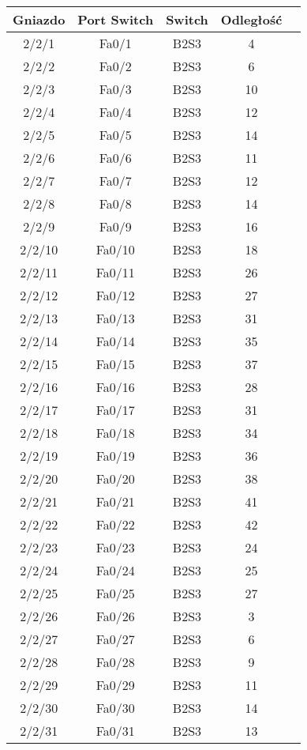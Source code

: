 \begin{center}
    \begin{longtable}{|c|c|c|c|c|}
    \hline
    Gniazdo & Port Switch & Switch & Odległość \\ \hline
	2/2/1 & Fa0/1 & B2S3 & 4 \\ \hline
	2/2/2 & Fa0/2 & B2S3 & 6 \\ \hline
	2/2/3 & Fa0/3 & B2S3 & 10 \\ \hline
	2/2/4 & Fa0/4 & B2S3 & 12 \\ \hline
	2/2/5 & Fa0/5 & B2S3 & 14 \\ \hline
	2/2/6 & Fa0/6 & B2S3 & 11 \\ \hline
	2/2/7 & Fa0/7 & B2S3 & 12 \\ \hline
	2/2/8 & Fa0/8 & B2S3 & 14 \\ \hline
	2/2/9 & Fa0/9 & B2S3 & 16 \\ \hline
	2/2/10 & Fa0/10 & B2S3 & 18 \\ \hline
	2/2/11 & Fa0/11 & B2S3 & 26 \\ \hline
	2/2/12 & Fa0/12 & B2S3 & 27 \\ \hline
	2/2/13 & Fa0/13 & B2S3 & 31 \\ \hline
	2/2/14 & Fa0/14 & B2S3 & 35 \\ \hline
	2/2/15 & Fa0/15 & B2S3 & 37 \\ \hline
	2/2/16 & Fa0/16 & B2S3 & 28 \\ \hline
	2/2/17 & Fa0/17 & B2S3 & 31 \\ \hline
	2/2/18 & Fa0/18 & B2S3 & 34 \\ \hline
	2/2/19 & Fa0/19 & B2S3 & 36 \\ \hline
	2/2/20 & Fa0/20 & B2S3 & 38 \\ \hline
	2/2/21 & Fa0/21 & B2S3 & 41 \\ \hline
	2/2/22 & Fa0/22 & B2S3 & 42 \\ \hline
	2/2/23 & Fa0/23 & B2S3 & 24 \\ \hline
	2/2/24 & Fa0/24 & B2S3 & 25 \\ \hline
	2/2/25 & Fa0/25 & B2S3 & 27 \\ \hline
	2/2/26 & Fa0/26 & B2S3 & 3 \\ \hline
	2/2/27 & Fa0/27 & B2S3 & 6 \\ \hline
	2/2/28 & Fa0/28 & B2S3 & 9 \\ \hline
	2/2/29 & Fa0/29 & B2S3 & 11 \\ \hline
	2/2/30 & Fa0/30 & B2S3 & 14 \\ \hline
	2/2/31 & Fa0/31 & B2S3 & 13 \\ \hline

\end{longtable}
\end{center}
